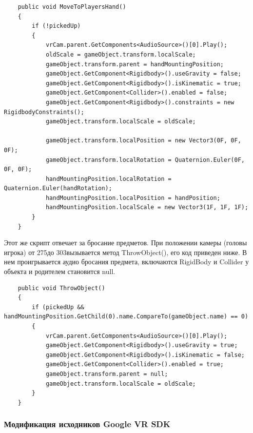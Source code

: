 \begin{small}
	\begin{verbatim}
    public void MoveToPlayersHand()
    {
        if (!pickedUp)
        {
            vrCam.parent.GetComponents<AudioSource>()[0].Play();
            oldScale = gameObject.transform.localScale;
            gameObject.transform.parent = handMountingPosition;
            gameObject.GetComponent<Rigidbody>().useGravity = false;
            gameObject.GetComponent<Rigidbody>().isKinematic = true;
            gameObject.GetComponent<Collider>().enabled = false;
            gameObject.GetComponent<Rigidbody>().constraints = new RigidbodyConstraints();
            gameObject.transform.localScale = oldScale;
            
            gameObject.transform.localPosition = new Vector3(0F, 0F, 0F);
            gameObject.transform.localRotation = Quaternion.Euler(0F, 0F, 0F);
            handMountingPosition.localRotation = Quaternion.Euler(handRotation);
            handMountingPosition.localPosition = handPosition;
            handMountingPosition.localScale = new Vector3(1F, 1F, 1F);
        }
    }
	\end{verbatim}
\end{small}


Этот же скрипт отвечает за бросание предметов. При положении камеры (головы игрока) от 275\degr до 303\degr вызывается метод ThrowObject(), его код приведен ниже. В нем проигрывается аудио бросания предмета, включаются RigidBody и Collider у объекта и родителем становится null.

\begin{small}
    \begin{verbatim}
    public void ThrowObject()
    {
        if (pickedUp && handMountingPosition.GetChild(0).name.CompareTo(gameObject.name) == 0)
        {
            vrCam.parent.GetComponents<AudioSource>()[0].Play();
            gameObject.GetComponent<Rigidbody>().useGravity = true;
            gameObject.GetComponent<Rigidbody>().isKinematic = false;
            gameObject.GetComponent<Collider>().enabled = true;
            gameObject.transform.parent = null;
            gameObject.transform.localScale = oldScale;
        }
    }
    \end{verbatim}
\end{small}

\subsubsection{Модификация исходников Google VR SDK}

